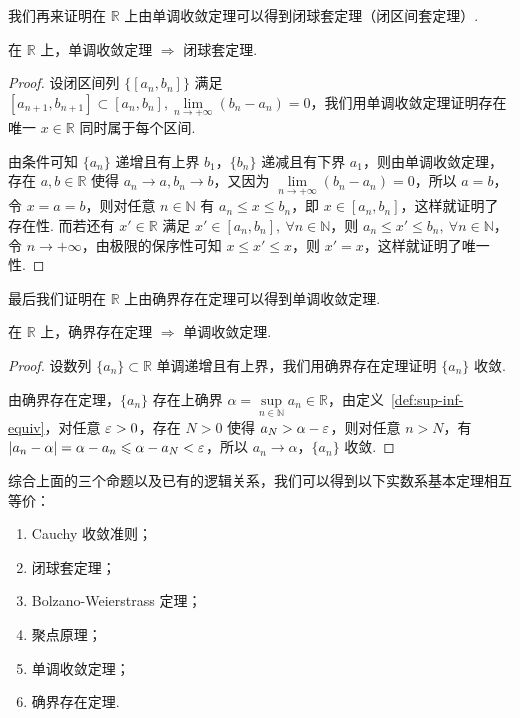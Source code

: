 \documentclass[../main.tex]{subfiles}
\begin{document}
我们再来证明在 $\mathbb R$ 上由单调收敛定理可以得到闭球套定理（闭区间套定理）. 

\begin{proposition}
    在 $\mathbb R$ 上，单调收敛定理 $\Longrightarrow$ 闭球套定理. 
\end{proposition}

\begin{proof}
    设闭区间列 $\{[a_n, b_n]\}$ 满足 $[a_{n + 1}, b_{n + 1}] \subset [a_n, b_n], \lim\limits_{n \to +\infty} (b_n - a_n) = 0$，我们用单调收敛定理证明存在唯一 $x \in \mathbb R$ 同时属于每个区间. 

    由条件可知 $\{a_n\}$ 递增且有上界 $b_1$，$\{b_n\}$ 递减且有下界 $a_1$，则由单调收敛定理，存在 $a, b \in \mathbb R$ 使得 $a_n \to a, b_n \to b$，又因为 $\lim\limits_{n \to +\infty} (b_n - a_n) = 0$，所以 $a = b$，令 $x = a = b$，则对任意 $n \in \mathbb N$ 有 $a_n \leqslant x \leqslant b_n$，即 $x \in [a_n, b_n]$，这样就证明了存在性. 而若还有 $x' \in \mathbb R$ 满足 $x' \in [a_n, b_n],\ \forall n \in \mathbb N$，则 $a_n \leqslant x' \leqslant b_n,\ \forall n \in \mathbb N$，令 $n \to +\infty$，由极限的保序性可知 $x \leqslant x' \leqslant x$，则 $x' = x$，这样就证明了唯一性. 
\end{proof}

最后我们证明在 $\mathbb R$ 上由确界存在定理可以得到单调收敛定理. 

\begin{proposition}
    在 $\mathbb R$ 上，确界存在定理 $\Longrightarrow$ 单调收敛定理. 
\end{proposition}

\begin{proof}
    设数列 $\{a_n\} \subset \mathbb R$ 单调递增且有上界，我们用确界存在定理证明 $\{a_n\}$ 收敛. 

    由确界存在定理，$\{a_n\}$ 存在上确界 $\alpha = \sup\limits_{n \in \mathbb N} a_n \in \mathbb R$，由定义~\ref{def:sup-inf-equiv}，对任意 $\varepsilon > 0$，存在 $N > 0$ 使得 $a_N > \alpha - \varepsilon$，则对任意 $n > N$，有 $|a_n - \alpha| = \alpha - a_n \leqslant \alpha - a_N < \varepsilon$，所以 $a_n \to \alpha$，$\{a_n\}$ 收敛. 
\end{proof}

综合上面的三个命题以及已有的逻辑关系，我们可以得到以下实数系基本定理相互等价：
\begin{enumerate}[label=(\alph*)]
    \item Cauchy 收敛准则；
    \item 闭球套定理；
    \item Bolzano-Weierstrass 定理；
    \item 聚点原理；
    \item 单调收敛定理；
    \item 确界存在定理. 
\end{enumerate}
\end{document}
